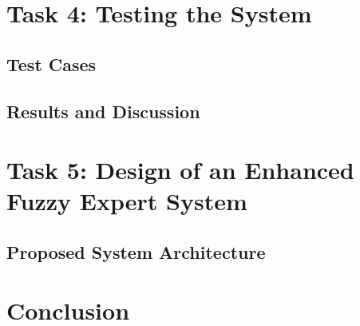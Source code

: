 \documentclass{article}
\begin{document}
\section{Task 4: Testing the System}


\subsection{Test Cases}


\subsection{Results and Discussion}


\section{Task 5: Design of an Enhanced Fuzzy Expert System}


\subsection{Proposed System Architecture}


\section{Conclusion}



\printbibliography
\end{document}
